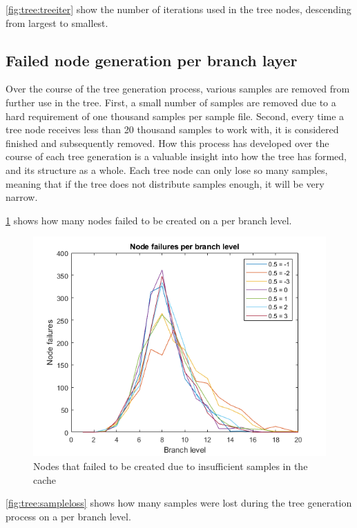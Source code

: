 \cref{fig:tree:treeiter} show the number of iterations used in the tree nodes, descending from largest to smallest.

\subsection{Failed node generation per branch layer}
Over the course of the tree generation process, various samples are removed from further use in the tree.
First, a small number of samples are removed due to a hard requirement of one thousand samples per sample file.
Second, every time a tree node receives less than 20 thousand samples to work with, it is considered finished and subsequently removed.
How this process has developed over the course of each tree generation is a valuable insight into how the tree has formed, and its structure as a whole.
Each tree node can only lose so many samples, meaning that if the tree does not distribute samples enough, it will be very narrow.

\cref{fig:tree:nodefail} shows how many nodes failed to be created on a per branch level.

\begin{figure}  %
  \centering
  \includegraphics[width=.7\textwidth]{figures/treenodefail.png}
  \caption{Nodes that failed to be created due to insufficient samples in the cache}
  \label{fig:tree:nodefail}
\end{figure}

\cref{fig:tree:sampleloss} shows how many samples were lost during the tree generation process on a per branch level.

